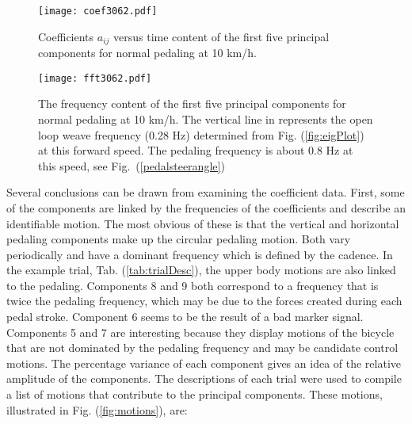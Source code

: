 \documentclass[smallextended]{svjour3}     %
\begin{document}
\begin{figure}[tb]
    \begin{center}
        \texttt{[image: coef3062.pdf]}
    \end{center}
    \caption{Coefficients $a_{ij}$ versus time content of the first five
    principal components for normal pedaling at 10 km/h.}
    \label{fig:coef3062}
\end{figure}
\begin{figure}[tb]
    \begin{center}
        \texttt{[image: fft3062.pdf]}
    \end{center}
    \caption{The frequency
    content of the first five principal components for normal pedaling at 10
    km/h. The vertical line in represents the open loop weave frequency
    (0.28 Hz) determined from Fig. (\ref{fig:eigPlot}) at this forward speed.
    The pedaling frequency is about 0.8 Hz at this speed, see
    Fig.~(\ref{pedalsteerangle})}
    \label{fig:fft3062}
\end{figure}
Several conclusions can be drawn from examining the coefficient data. First,
some of the components are linked by the frequencies of the coefficients
and describe an identifiable motion. The most obvious of these is that the vertical
and horizontal pedaling components make up the circular pedaling motion.
Both vary periodically and have a dominant frequency which is defined by the
cadence. In the example trial, Tab. (\ref{tab:trialDesc}), the upper body
motions are also linked to the pedaling. Components 8 and 9 both correspond to
a frequency that is twice the pedaling frequency, which may be due to the
forces created during each pedal stroke. Component 6 seems to be the result of a
bad marker signal. Components 5 and 7 are interesting because they display
motions of the bicycle that are not dominated by the pedaling frequency and may
be candidate control motions. The percentage variance of each component gives
an idea of the relative amplitude of the components. The descriptions of each
trial were used to compile a list of motions that contribute to the principal
components. These motions, illustrated in Fig. (\ref{fig:motions}), are:
\end{document}
